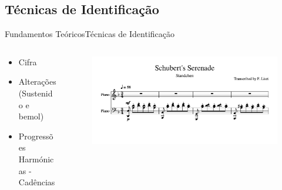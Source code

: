 \subsection{Técnicas de Identificação}
\begin{frame}{Fundamentos Teóricos}{Técnicas de Identificação}
    \begin{columns}[]
        \begin{column}{.4\textwidth}
            \begin{itemize}
            \item Cifra
            \item Alterações (Sustenido e bemol)
            \item Progressões Harmónicas - Cadências
            \end{itemize}
        \end{column}
        \begin{column}{.6\textwidth}
            \begin{figure}
                \includegraphics[width=.95\textwidth]{figs/schubert.png}
            \end{figure}
        \end{column}
    \end{columns}
\end{frame}
